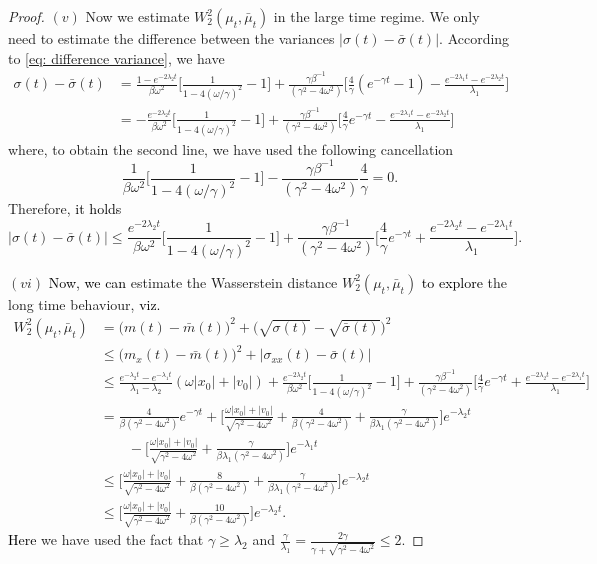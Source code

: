 \documentclass[a4paper,twoside]{article}      %
\theoremstyle{definition}
\newcommand{\AM}{\textcolor{black}}
\begin{document}
\begin{proof}
$(v)$ Now we estimate $W_2^2(\mu_t,\bar{\mu}_t)$ in the large time regime. We only need to estimate the difference between the variances $|\sigma(t)-\bar{\sigma}(t)|$. According to \eqref{eq: difference variance}, we have
\begin{align}
\sigma(t)-\bar{\sigma}(t)&=\frac{1-e^{-2\lambda_2 t}}{\beta\omega^2}\Big[\frac{1}{1-4(\omega/\gamma)^2}-1\Big]+\frac{\gamma\beta^{-1}}{(\gamma^2-4\omega^2)}\Big[\frac{4}{\gamma}(e^{-\gamma t}-1)-\frac{e^{-2\lambda_1 t}-e^{-2\lambda_2 t}}{\lambda_1}\Big]
\nonumber\\
&=-\frac{e^{-2\lambda_2 t}}{\beta\omega^2}\Big[\frac{1}{1-4(\omega/\gamma)^2}-1\Big]+\frac{\gamma\beta^{-1}}{(\gamma^2-4\omega^2)}\Big[\frac{4}{\gamma}e^{-\gamma t}-\frac{e^{-2\lambda_1 t}-e^{-2\lambda_2 t}}{\lambda_1}\Big]\nonumber
\end{align}
where, to obtain the second line, we have used the following cancellation
$$
\frac{1}{\beta\omega^2}\Big[\frac{1}{1-4(\omega/\gamma)^2}-1\Big]-\frac{\gamma\beta^{-1}}{(\gamma^2-4\omega^2)}\frac{4}{\gamma}=0.
$$
Therefore, \AM{ it holds }
$$
|\sigma(t)-\bar{\sigma}(t)|\leq \frac{e^{-2\lambda_2 t}}{\beta\omega^2}\Big[\frac{1}{1-4(\omega/\gamma)^2}-1\Big]+\frac{\gamma\beta^{-1}}{(\gamma^2-4\omega^2)}\Big[\frac{4}{\gamma}e^{-\gamma t}+\frac{e^{-2\lambda_2 t}-e^{-2\lambda_1 t}}{\lambda_1}\Big].
$$

$(vi)$ \AM{Now, we can }estimate the Wasserstein distance $W_2^2(\mu_t,\bar{\mu}_t)$ \AM{to explore } the long time behaviour, \AM{viz.}
\begin{align*}
W_2^2(\mu_t,\bar{\mu}_t)&=\big(m(t)-\bar{m}(t)\big)^2+\Big(\sqrt{\sigma(t)}-\sqrt{\bar{\sigma}(t)}\Big)^2
\\&\leq \big(m_x(t)-\bar{m}(t)\big)^2+|\sigma_{xx}(t)-\bar{\sigma}(t)|
\\& \leq \frac{e^{-\lambda_2 t}-e^{-\lambda_1 t}}{\lambda_1-\lambda_2}(\omega |x_0|+ |v_0|)+\frac{e^{-2\lambda_2 t}}{\beta\omega^2}\Big[\frac{1}{1-4(\omega/\gamma)^2}-1\Big]+\frac{\gamma\beta^{-1}}{(\gamma^2-4\omega^2)}\Big[\frac{4}{\gamma}e^{-\gamma t}+\frac{e^{-2\lambda_2 t}-e^{-2\lambda_1 t}}{\lambda_1}\Big]
\\&=\frac{4}{\beta(\gamma^2-4\omega^2)}e^{-\gamma t}+\Big[\frac{\omega|x_0|+|v_0|}{\sqrt{\gamma^2-4\omega^2}}+\frac{4}{\beta(\gamma^2-4\omega^2)}+\frac{\gamma}{\beta\lambda_1(\gamma^2-4\omega^2)}\Big]e^{-\lambda_2 t}
\\&\qquad-\Big[\frac{\omega|x_0|+|v_0|}{\sqrt{\gamma^2-4\omega^2}}+\frac{\gamma}{\beta\lambda_1(\gamma^2-4\omega^2)}\Big]e^{-\lambda_1 t}
\\& \leq \Big[\frac{\omega|x_0|+|v_0|}{\sqrt{\gamma^2-4\omega^2}}+\frac{8}{\beta(\gamma^2-4\omega^2)}+\frac{\gamma}{\beta\lambda_1(\gamma^2-4\omega^2)}\Big]e^{-\lambda_2 t}
\\& \leq \Big[\frac{\omega|x_0|+|v_0|}{\sqrt{\gamma^2-4\omega^2}}+\frac{10}{\beta(\gamma^2-4\omega^2)}\Big]e^{-\lambda_2 t}.
\end{align*}
\AM{Here} we have used the fact that $\gamma\geq \lambda_2$ and $\frac{\gamma}{\lambda_1}=\frac{2\gamma}{\gamma+\sqrt{\gamma^2-4\omega^2}}\leq 2$.


\end{proof}
\end{document}

